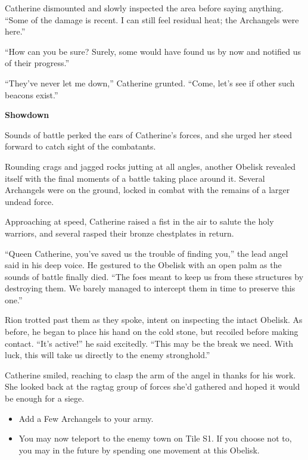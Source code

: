 \begin{multicols*}{2}
Catherine dismounted and slowly inspected the area before saying anything.
``Some of the damage is recent.
I can still feel residual heat; the Archangels were here.''

``How can you be sure? Surely, some would have found us by now and notified us of their progress.''

``They've never let me down,'' Catherine grunted.
``Come, let's see if other such beacons exist.''

\textbf{Showdown}

Sounds of battle perked the ears of Catherine's forces, and she urged her steed forward to catch sight of the combatants.

Rounding crags and jagged rocks jutting at all angles, another Obelisk revealed itself with the final moments of a battle taking place around it.
Several Archangels were on the ground, locked in combat with the remains of a larger undead force.

Approaching at speed, Catherine raised a fist in the air to salute the holy warriors, and several rasped their bronze chestplates in return.

``Queen Catherine, you've saved us the trouble of finding you,'' the lead angel said in his deep voice.
He gestured to the Obelisk with an open palm as the sounds of battle finally died.
``The foes meant to keep us from these structures by destroying them.
We barely managed to intercept them in time to preserve this one.''

Rion trotted past them as they spoke, intent on inspecting the intact Obelisk.
As before, he began to place his hand on the cold stone, but recoiled before making contact.
``It's active!'' he said excitedly.
``This may be the break we need.
With luck, this will take us directly to the enemy stronghold.''

Catherine smiled, reaching to clasp the arm of the angel in thanks for his work.
She looked back at the ragtag group of forces she'd gathered and hoped it would be enough for a siege.

\begin{itemize}
  \item \textcolor{darkcandyapplered}{Add a Few Archangels to your army.}
  \item \textcolor{darkcandyapplered}{You may now teleport to the enemy town on Tile S1.
  If you choose not to, you may in the future by spending one movement at this Obelisk.}
\end{itemize}



\end{multicols*}
